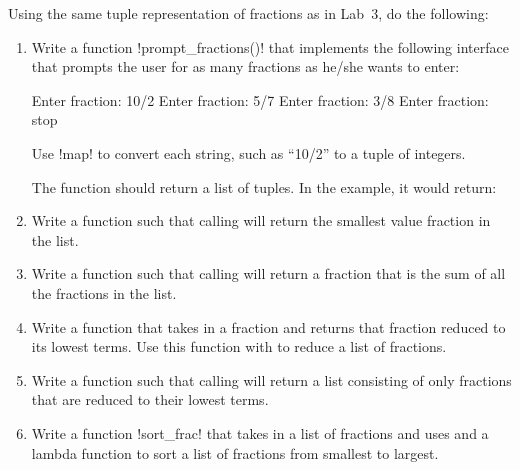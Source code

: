 \documentclass[11pt]{cselabheader}
\begin{document}
\begin{ex}[fractions2.py] Using the same tuple representation of fractions as in
    Lab~3, do the following:

    \begin{enumerate}
      \item Write a function \pythoninline!prompt_fractions()! that implements the
        following interface that prompts the user for as many fractions as
        he/she wants to enter:

        \begin{verbatimcode}
Enter fraction: 10/2
Enter fraction: 5/7
Enter fraction: 3/8
Enter fraction: stop
        \end{verbatimcode}

        Use \pythoninline!map! to convert each string, such as ``10/2'' to a
        tuple of integers.

        The function should return a list of tuples. In the example, it would
        return:
        \begin{python3code}
[(10, 2), (5, 7), (3, 8)]
        \end{python3code}

      \item Write a function  such that calling
         will return
        the smallest value fraction in the list.
      \item Write a function  such that calling
         will return
        a fraction that is the sum of all the fractions in the list.
      \item Write a function  that takes in a fraction
        and returns that fraction reduced to its lowest terms. Use this function
        with  to reduce a list of fractions.
      \item Write a function  such that calling
         will return a list consisting
        of only fractions that are reduced to their lowest terms.
      \item Write a function \pythoninline!sort_frac! that takes in a list of
        fractions and uses 
        and a lambda  function to sort a list of fractions from
        smallest to largest.
    \end{enumerate}


\end{ex}
\end{document}
